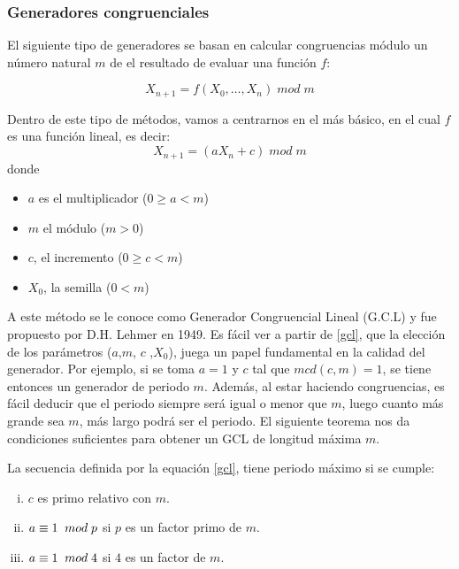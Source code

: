 \subsubsection{Generadores congruenciales}

El siguiente tipo de generadores se basan en calcular congruencias módulo un número natural $m$ de el resultado de evaluar una función $f$:

\begin{equation}\label{gc}
X_{n+1}=f(X_0,\ldots, X_n)\;mod\;m
\end{equation}

Dentro de este tipo de métodos, vamos a centrarnos en el más básico, en el cual $f$ es una función lineal, es decir:
\begin{equation}\label{gcl}
X_{n+1}=(aX_n+c)\;mod\;m	
\end{equation}
donde 
\begin{itemize}
\item $a$ es el multiplicador ($0\geq a<m$)
\item $m$ el módulo ($m>0$)
\item $c$, el incremento ($0\geq c < m$)
\item $X_0$, la semilla ($0 < m$)
\end{itemize}

A este método se le conoce como Generador Congruencial Lineal (G.C.L) y fue propuesto por D.H. Lehmer en 1949. Es fácil ver a partir de \eqref{gcl}, que la elección de los parámetros ($a$,$m$, $c$ ,$X_0$), juega un papel fundamental en la calidad del generador. Por ejemplo, si se toma  $a=1$ y $c$ tal que $mcd(c,m)=1$, se tiene entonces un generador de periodo $m$. Además, al estar haciendo congruencias, es fácil deducir que el periodo siempre será igual o menor que $m$, luego cuanto más grande sea $m$, más largo podrá ser el periodo. El siguiente teorema nos da condiciones suficientes para obtener un GCL de longitud máxima $m$.

\begin{theorem}
La secuencia definida por la equación \eqref{gcl}, tiene periodo máximo si se cumple:
\begin{enumerate}[(i)]
\item $c$ es primo relativo con $m$.
\item $a \equiv 1 \;\;mod \; p$ si $p$ es un factor primo de $m$.
\item $a \equiv 1 \;\;mod \; 4$ si $4$ es un factor de $m$.
\end{enumerate}
\end{theorem}

